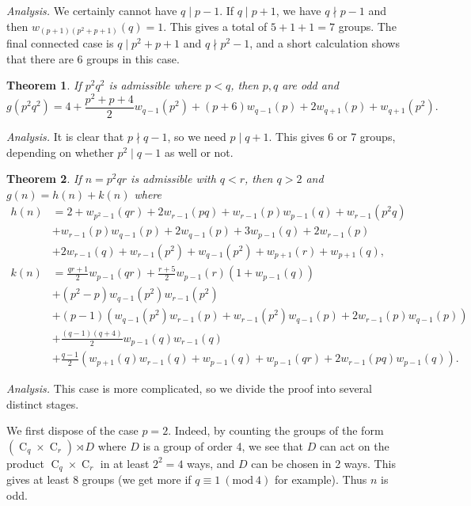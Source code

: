 \documentclass{article}
\newcommand{\cyc}[1]{\operatorname{C}_{#1}}
\newcommand{\Mod}[1]{\ (\mathrm{mod} \ #1)}
\theoremstyle{plain}
\newtheorem{fact}{Theorem}[section]
\theoremstyle{definition}
\begin{document}
\textit{Analysis.} We certainly cannot have $q \mid p - 1$. If $q \mid p + 1$, we have $q \nmid p - 1$ and then $w_{(p + 1)(p^2 + p + 1)}(q) = 1$. This gives a total of $5 + 1 + 1 = 7$ groups. The final connected case is $q \mid p^2 + p + 1$ and $q \nmid p^2 - 1$, and a short calculation shows that there are 6 groups in this  case.

\begin{fact}
	If $p^2 q^2$ is admissible where $p < q$, then $p, q$ are odd and
	\[g(p^2 q^2) = 4 + \frac{p^2 + p + 4}{2} w_{q - 1}(p^2) + (p + 6)w_{q - 1}(p) + 2w_{q + 1}(p) + w_{q + 1}(p^2).\]
\end{fact}

\textit{Analysis.} It is clear that $p \nmid q - 1$, so we need $p \mid q + 1$. This gives 6 or 7 groups, depending on whether $p^2 \mid q - 1$ as well or not.

\begin{fact} 
	If $n = p^2 q r$ is admissible with $q < r$, then $q > 2$ and $g(n) = h(n) + k(n)$ where$$\begin{aligned}
		h(n) &= 2 + w_{p^2 - 1}(qr) + 2w_{r - 1}(pq) + w_{r - 1}(p)w_{p - 1}(q) + w_{r - 1}(p^2 q) \\ 
		&+ w_{r - 1}(p)w_{q - 1}(p) + 2w_{q - 1}(p) + 3w_{p - 1}(q) + 2w_{r - 1}(p) \\ 
		&+ 2w_{r - 1}(q) + w_{r - 1}(p^2) + w_{q - 1}(p^2) + w_{p + 1}(r) + w_{p + 1}(q), \\
		k(n) &= \frac{qr + 1}{2} w_{p - 1}(qr) + \frac{r + 5}{2} w_{p - 1}(r)(1 + w_{p - 1}(q))\\
		&+ (p^2 - p)w_{q - 1}(p^2)w_{r - 1}(p^2) \\
		&+ (p - 1)(w_{q - 1}(p^2)w_{r - 1}(p) + w_{r - 1}(p^2)w_{q - 1}(p) + 2w_{r - 1}(p)w_{q - 1}(p)) \\
		&+ \frac{(q - 1)(q + 4)}{2} w_{p - 1}(q)w_{r - 1}(q) \\
		&+ \frac{q - 1}{2} (w_{p + 1}(q)w_{r - 1}(q) + w_{p - 1}(q) + w_{p - 1}(qr) + 2w_{r - 1}(pq)w_{p - 1}(q)).
	\end{aligned}$$
\end{fact}

\textit{Analysis.} This case is more complicated, so we divide the proof into several distinct stages.

We first dispose of the case $p = 2$. Indeed, by counting the groups of the form $(\cyc{q} \times \cyc{r}) \rtimes D$ where $D$ is a group of order 4, we see that $D$ can act on the product $\cyc{q} \times \cyc{r}$ in at least $2^2 = 4$ ways, and $D$ can be chosen in 2 ways. This gives at least 8 groups (we get more if $q \equiv 1 \Mod{4}$ for example). Thus $n$ is odd.
\end{document}
